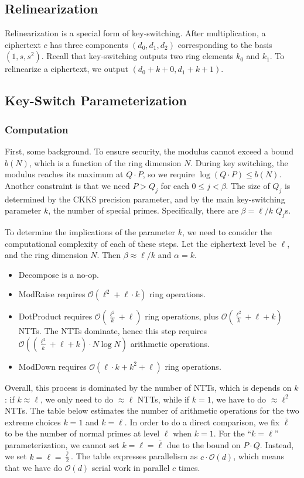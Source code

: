 \documentclass[../keyswitching.tex]{subfiles}
\begin{document}
\subsection{Relinearization}
Relinearization is a special form of key-switching. After multiplication, a ciphertext $c$ has three components $(d_0, d_1, d_2)$ corresponding to the basis $(1, s, s^2)$. Recall that key-switching outputs two ring elements $k_0$ and $k_1$. To relinearize a ciphertext, we output $(d_0+k+0, d_1+k+1)$.

\subsection{Key-Switch Parameterization}
\subsubsection{Computation}
First, some background. To ensure security, the modulus cannot exceed a bound $b(N)$, which is a function of the ring dimension $N$. During key switching, the modulus reaches its maximum at $Q\cdot P$, so we require $\log{(Q\cdot P)}\le b(N)$. Another constraint is that we need $P > Q_j$ for each $0\le j<\beta$. The size of $Q_j$ is determined by the CKKS precision parameter, and by the main key-switching parameter $k$, the number of special primes. Specifically, there are $\beta=\ell/k$ $Q_j$s. 

To determine the implications of the parameter $k$, we need to consider the computational complexity of each of these steps. Let the ciphertext level be $\ell$, and the ring dimension $N$. Then $\beta\approx \ell/k$ and $\alpha =k$.
\begin{itemize}
	\item Decompose is a no-op.
	\item ModRaise requires $\mathcal{O}(\ell^2 + \ell\cdot k)$ ring operations.
	\item DotProduct requires $\mathcal{O}(\frac{\ell^2}{k}+\ell)$ ring operations, plus $\mathcal{O}(\frac{\ell^2}{k}+\ell+k)$ NTTs. The NTTs dominate, hence this step requires $\mathcal{O}((\frac{\ell^2}{k}+\ell+k)\cdot N\log N)$ arithmetic operations.
	\item ModDown requires $\mathcal{O}(\ell\cdot k + k^2 + \ell)$ ring operations.
\end{itemize}

Overall, this process is dominated by the number of NTTs, which is depends on $k$: if $k\approx \ell$, we only need to do $\approx \ell$ NTTs, while if $k=1$, we have to do $\approx \ell^2$ NTTs. The table below estimates the number of arithmetic operations for the two extreme choices $k=1$ and $k=\ell$. In order to do a direct comparison, we fix $\bar{\ell}$ to be the number of normal primes at level $\ell$ when $k=1$. For the ``$k=\ell$'' parameterization, we cannot set $k=\ell=\bar{\ell}$ due to the bound on $P\cdot Q$. Instead, we set $k=\ell=\frac{\bar{\ell}}{2}$. The table expresses parallelism as $c\cdot \mathcal{O}(d)$, which means that we have do $\mathcal{O}(d)$ serial work in parallel $c$ times.
\end{document}

